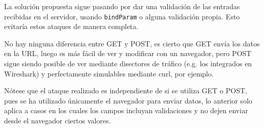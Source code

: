 \documentclass{article}
\begin{document}
La solución propuesta sigue pasando por dar una validación de las entradas recibidas en el servidor, usando \texttt{bindParam} o alguna validación propia. Esto evitaría estos ataques de manera completa.

No hay ninguna diferencia entre GET y POST, es cierto que GET envía los datos en la URL, luego es más fácil de ver y modificar con un navegador, pero POST sigue siendo posible de ver mediante disectores de tráfico (e.g. los integrados en Wireshark) y perfectamente simulables mediante curl, por ejemplo. 

Nótese que el ataque realizado es independiente de si se utiliza GET o POST, pues se ha utilizado únicamente el navegador para enviar datos, lo anterior solo aplica a casos en los cuales los campos incluyan validaciones y no dejen enviar desde el navegador ciertos valores.
\end{document}
